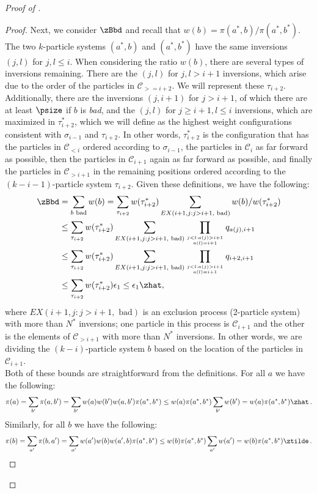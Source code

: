 \begin{proof}[Proof of ]
\begin{proof}
Next, we consider $\zBbd$ and recall that $w(b) = 
\pi(a^*,b)/\pi(a^*,b^*).$  The two $k$-particle systems $(a^*,b)$ and 
$(a^*,b^*)$ have the same inversions $(j,l)$ for $j,l \leq i$.  When 
considering the ratio $w(b)$, there are several types of inversions 
remaining.  There are the $(j,l)$ for $j,l > i+1$ inversions, which 
arise due to the order of the particles in $\mathcal{C}_{>= i+2}$.  We 
will represent these $\tau_{i+2}$.  Additionally, there are the 
inversions $(j,i+1)$ for $j > i+1$, of which there are at least 
$\psize$ if $b$ is \emph{bad}, and the $(j,l)$ for $j \geq i+1, l \leq 
i$ inversions, which are maximized in $\tau_{i+2}^*$, which we will 
define as the highest weight configurations consistent with 
$\sigma_{i-1}$ and $\tau_{i+2}$. In other words, $\tau_{i+2}^*$ is the 
configuration that has the particles in $\mathcal{C}_{< i}$ ordered 
according to $\sigma_{i-1}$, the particles in $\mathcal{C}_{i}$ as far 
forward as possible, then the particles in $\mathcal{C}_{i+1}$ again as 
far forward as possible, and finally the particles in 
$\mathcal{C}_{>i+1}$ in the remaining positions ordered according to 
the $(k-i-1)$-particle system $\tau_{i+2}$.  Given these definitions, 
we have the following:
\begin{align*}
\zBbd &=  \sum_{b \text{ bad}} w(b)=  \sum_{\tau_{i+2}} w (\tau_{i+2}^*) \sum_{EX(i+1,j: j>i+1, \text{ bad})}w(b)/w(\tau_{i+2}^*) \\
&\leq \sum_{\tau_{i+2} }w (\tau_{i+2}^*) \sum_{EX(i+1,j: j>i+1, \text{ bad})}\prod_{j<l: a(j) > i +1\atop a(l) = i+1}q_{a(j), i+1} \\
&\leq \sum_{\tau_{i+2}} w (\tau_{i+2}^*) \sum_{EX(i+1,j: j>i+1, \text{ bad})}\prod_{j<l: a(j) > i +1\atop a(l) = i+1}q_{i+2, i+1} \\
&\leq \sum_{\tau_{i+2}} w (\tau_{i+2}^*)\epsilon_1 \leq \epsilon_1 \zhat,
\end{align*}
where $EX(i+1,j: j>i+1, \text{ bad})$ is an exclusion process 
(2-particle system) with more than $N^*$ inversions; one particle in 
this process is $\mathcal{C}_{i+1}$ and the other is the elements of 
$\mathcal{C}_{>i+1}$ with more than $N^*$ inversions.  In other words, 
we are dividing the $(k-i)$-particle system $b$ based on the location 
of the particles in $\mathcal{C}_{i+1}$.\\


Both of these bounds are straightforward from the definitions. 
For all $a$ we have the following:
 $$\pi(a) = \sum_{b'} \pi(a,b') = \sum_{b'} w(a)w(b')w(a,b')\pi(a^*,b^*) \leq w(a)\pi(a^*,b^*)\sum_{b'}w(b')= w(a)\pi(a^*,b^*)\zhat\,.$$
Similarly, for all $b$ we have the following:
 $$\pi(b) = \sum_{a'} \pi(b,a') = \sum_{a'} w(a')w(b)w(a',b)\pi(a^*,b^*) \leq w(b)\pi(a^*,b^*)\sum_{a'}w(a')= w(b)\pi(a^*,b^*)\ztilde\,.$$



\end{proof}
\end{proof}
